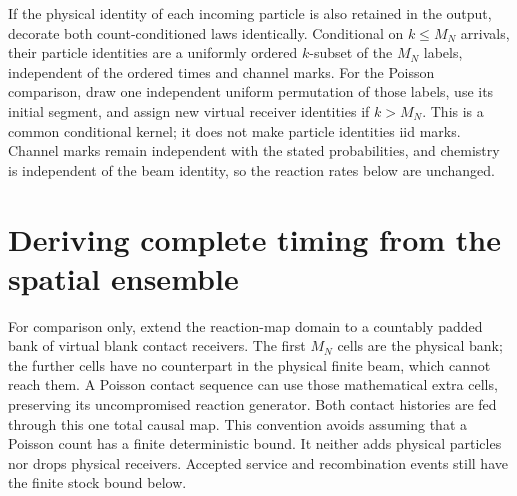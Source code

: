 \documentclass[11pt,oneside,openany]{book}
\theoremstyle{definition}
\theoremstyle{remark}\newtheorem{remark}[theorem]{Remark}
\begin{document}
If the physical identity of each incoming particle is also retained in
the output, decorate both count-conditioned laws identically.  Conditional
on $k\le M_N$ arrivals, their particle identities are a uniformly ordered
$k$-subset of the $M_N$ labels, independent of the ordered times and
channel marks.  For the Poisson comparison, draw one independent uniform
permutation of those labels, use its initial segment, and assign new
virtual receiver identities if $k>M_N$.  This is a common conditional
kernel; it does not make particle identities iid marks.  Channel marks
remain independent with the stated probabilities, and chemistry is
independent of the beam identity, so the reaction rates below are unchanged.

\section{Deriving complete timing from the spatial ensemble}
For comparison only, extend the reaction-map domain to a countably padded bank of virtual blank contact receivers. The first $M_N$ cells are the physical bank; the further cells have no counterpart in the physical finite beam, which cannot reach them. A Poisson contact sequence can use those mathematical extra cells, preserving its uncompromised reaction generator. Both contact histories are fed through this one total causal map. This convention avoids assuming that a Poisson count has a finite deterministic bound. It neither adds physical particles nor drops physical receivers. Accepted service and recombination events still have the finite stock bound below.
\end{document}
